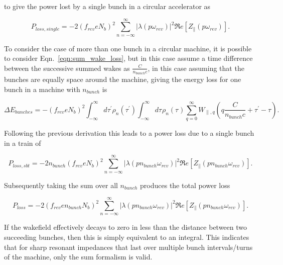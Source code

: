 \documentclass{cernyrep}
\begin{document}
to give the power lost by a single bunch in a circular accelerator as 

\begin{equation}
P_{loss, single} = - 2 \left( f_{rev} e N_{b}\right)^{2} \displaystyle\sum\limits_{n = -\infty}^{\infty}  \left| \lambda \left( p \omega_{rev} \right)  \right|^{2} \Re{}e \left[ Z_{\parallel} \left( p \omega_{rev} \right) \right].
\label{eqn:power_loss_single_bunch}
\end{equation}

To consider the case of more than one bunch in a circular machine, it is possible to consider Eqn.~\ref{eqn:sum_wake_loss}, but in this case assume a time difference between the successive summed wakes as $\frac{C}{n_{bunch}c}$, in this case assuming that the bunches are equally space around the machine, giving the energy loss for one bunch in a machine with $n_{bunch}$ is 

\begin{equation}
\Delta E_{bunches} = - \left( f_{rev} e  N_{b}\right)^{2} \int^{\infty}_{-\infty} d\tau^{'} \rho_{n} \left( \tau^{'} \right) \int^{\infty}_{-\infty} d\tau^{} \rho_{n} \left( \tau^{} \right) \displaystyle\sum\limits_{q = 0}^{\infty} W_{\parallel, q} \left( q\frac{C}{n_{bunch}c} + \tau^{'} - \tau \right).  
\label{eqn:sum_wake_loss_bunches}
\end{equation}

Following the previous derivation this leads to a power loss due to a single bunch in a train of 

\begin{equation}
P_{loss, sbt} = - 2 n_{bunch} \left( f_{rev} e  N_{b} \right) ^{2} \displaystyle\sum\limits_{n = -\infty}^{\infty}  \left| \lambda \left( p n_{bunch} \omega_{rev} \right)  \right|^{2} \Re{}e \left[ Z_{\parallel} \left( p n_{bunch}\omega_{rev} \right) \right].
\label{eqn:power_loss_train_single_bunch}
\end{equation}

Subsequently taking the sum over all $n_{bunch}$ produces the total power loss 

\begin{equation}
P_{loss} = - 2 \left( f_{rev} e n_{bunch}  N_{b}\right)^{2} \displaystyle\sum\limits_{n = -\infty}^{\infty}  \left| \lambda \left( p n_{bunch} \omega_{rev} \right)  \right|^{2} \Re{}e \left[ Z_{\parallel} \left( p n_{bunch}\omega_{rev} \right) \right].
\label{eqn:heating-gen}
\end{equation}

If the wakefield effectively decays to zero in less than the distance between two succeeding bunches, then this is simply equivalent to an integral. This indicates that for sharp resonant impedances that last over multiple bunch intervals/turns of the machine, only the sum formalism is valid.
\end{document}
